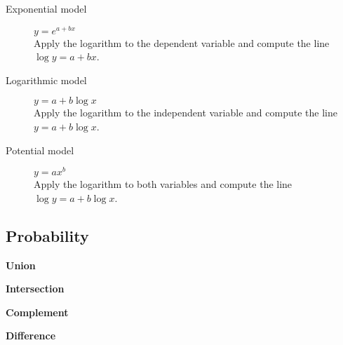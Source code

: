 \begin{multicols*}{2}
\begin{tcolorbox}[hbox, title=Non-linear regression]
\begin{minipage}{0.4\textwidth}
\begin{description}
\item[Exponential model] $y=e^{a+bx}$\\
      Apply the logarithm to the dependent variable and compute the line $\log y = a+bx$.
\item[Logarithmic model] $y=a+b\log x$\\
      Apply the logarithm to the independent variable and compute the line $y=a+b\log x$.
\item[Potential model] $y=ax^b$\\
      Apply the logarithm to both variables and compute the line $\log y = a+b\log x$.
\end{description}
\end{minipage}
\end{tcolorbox}

\newpage

\subsection*{Probability}

\begin{tcolorbox}[hbox, title=Event operations]
\begin{minipage}{0.4\textwidth}
\textbf{Union}
\begin{center}

\end{center}
\textbf{Intersection}
\begin{center}

\end{center}
\textbf{Complement}
\begin{center}

\end{center}
\textbf{Difference}
\begin{center}

\end{center}
\end{minipage}
\end{tcolorbox}


\end{multicols*}
